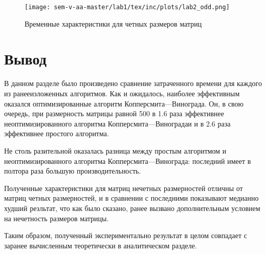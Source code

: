 \begin{figure}
    \centering
    \texttt{[image: sem-v-aa-master/lab1/tex/inc/plots/lab2\_odd.png]}
    \caption{Временные характеристики для четных размеров матриц}
    \label{fig:odd}
\end{figure}

\section{Вывод}

В данном разделе было произведено сравнение затраченного времени для каждого из ранееизложенных алгоритмов. Как и ожидалось, наиболее эффективным оказался оптимизированные алгоритм Копперсмита---Винограда. Он, в свою очередь, при размерность матрицы равной 500 в 1.6 раза эффективнее неоптимизированного алгоритма Копперсмита---Виноградаи и в 2.6 раза эффективнее простого алгоритма. 

Не столь разительной оказалась разница между простым алгоритмом и неоптимизированного алгоритма Копперсмита---Винограда: последний имеет в полтора раза большую производительность.

Полученные характеристики для  матриц нечетных размерностей отличны от матриц четных размерностей, и в сравнении с последними показывают медианно худший резльтат, что как было сказано, ранее вызвано дополнительным условием на нечетность размеров матрицы. 

Таким образом, полученный экспериментально результат в целом совпадает с заранее вычисленным теоретически в аналитическом разделе. 

